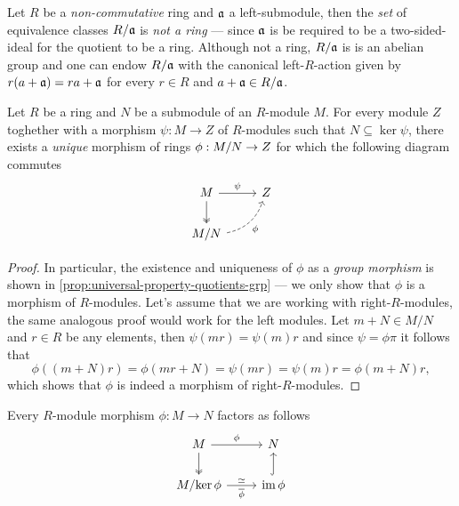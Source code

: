 \begin{example}
\label{exp:R/ideal-is-always-module}
Let \(R\) be a \emph{non-commutative} ring and \(\mathfrak{a}\) a left-submodule,
then the \emph{set} of equivalence classes \(R/\mathfrak{a}\) is \emph{not a ring}
--- since \(\mathfrak{a}\) is be required to be a two-sided-ideal for the quotient
to be a ring. Although not a ring, \(R/\mathfrak{a}\) is is an abelian group and
one can endow \(R/\mathfrak{a}\) with the canonical left-\(R\)-action given by
\(r (a + \mathfrak{a}) = r a + \mathfrak{a}\) for every \(r \in R\) and
\(a + \mathfrak{a} \in R/\mathfrak{a}\).
\end{example}

\begin{theorem}
\label{thm:univ-prop-quotient-modules}
Let \(R\) be a ring and \(N\) be a submodule of an \(R\)-module \(M\). For every
module \(Z\) toghether with a morphism \(\psi: M \to Z\) of \(R\)-modules such
that \(N \subseteq \ker \psi\), there exists a \emph{unique} morphism of rings
\(\phi: M/N \to Z\) for which the following diagram commutes
\[
\begin{tikzcd}
M \ar[d, two heads] \ar[r, "\psi"] & Z \\
M/N \ar[ru, dashed, bend right, "\phi"']
\end{tikzcd}
\]
\end{theorem}

\begin{proof}
In particular, the existence and uniqueness of \(\phi\) as a \emph{group
  morphism} is shown in \cref{prop:universal-property-quotients-grp} --- we only
show that \(\phi\) is a morphism of \(R\)-modules. Let's assume that we are
working with right-\(R\)-modules, the same analogous proof would work for the
left modules. Let \(m + N \in M/N\) and \(r \in R\) be any elements, then
\(\psi(m r) = \psi(m) r\) and since \(\psi = \phi \pi\) it follows that
\[
\phi((m + N) r) = \phi(m r + N) = \psi(m r) = \psi(m) r = \phi(m + N) r,
\]
which shows that \(\phi\) is indeed a morphism of right-\(R\)-modules.
\end{proof}

\begin{theorem}
\label{thm:R-module-morphism-factorization}
Every \(R\)-module morphism \(\phi: M \to N\) factors as follows
\[
\begin{tikzcd}
M \ar[r, "\phi"] \ar[d, two heads] &N \\
M/{\ker \phi} \ar[r, "\dis", "\overline{\phi}"'] & \im \phi \ar[u, hook]
\end{tikzcd}
\]
\end{theorem}

